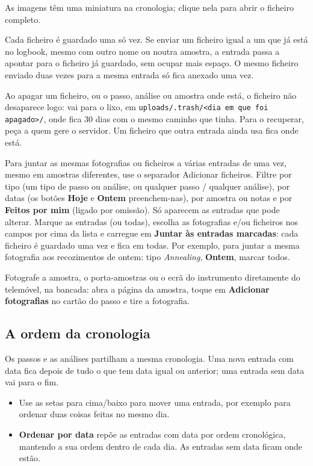 \documentclass[11pt,a4paper]{article}
\newcommand{\ui}[1]{\textsf{\textbf{#1}}}
\newcommand{\menu}[1]{\textsf{#1}}
\begin{document}
As imagens têm uma miniatura na cronologia; clique nela para abrir o
ficheiro completo.

Cada ficheiro é guardado uma só vez. Se enviar um ficheiro igual a um que já
está no logbook, mesmo com outro nome ou noutra amostra, a entrada passa a
apontar para o ficheiro já guardado, sem ocupar mais espaço. O mesmo
ficheiro enviado duas vezes para a mesma entrada só fica anexado uma vez.

Ao apagar um ficheiro, ou o passo, análise ou amostra onde está, o ficheiro
não desaparece logo: vai para o lixo, em
\nolinkurl{uploads/.trash/<dia em que foi apagado>/}, onde fica 30 dias com o
mesmo caminho que tinha. Para o recuperar, peça a quem gere o servidor. Um
ficheiro que outra entrada ainda usa fica onde está.

Para juntar as mesmas fotografias ou ficheiros a várias entradas de uma
vez, mesmo em amostras diferentes, use o separador \menu{Adicionar
ficheiros}. Filtre por tipo (um tipo de passo ou análise, ou qualquer passo
/ qualquer análise), por datas (os botões \ui{Hoje} e \ui{Ontem} preenchem-nas),
por amostra ou notas e por \ui{Feitos por mim} (ligado por omissão). Só
aparecem as entradas que pode alterar. Marque as entradas (ou todas), escolha
as fotografias e/ou ficheiros nos campos por cima da lista e carregue em \ui{Juntar às entradas marcadas}:
cada ficheiro é guardado uma vez e fica em todas. Por exemplo, para juntar a
mesma fotografia aos recozimentos de ontem: tipo \emph{Annealing},
\ui{Ontem}, marcar todos.

\begin{tip}
Fotografe a amostra, o porta-amostras ou o ecrã do instrumento diretamente
do telemóvel, na bancada: abra a página da amostra, toque em
\ui{Adicionar fotografias} no cartão do passo e tire a fotografia.
\end{tip}

\subsection{A ordem da cronologia}
\label{sec:timeline}

Os passos e as análises partilham a mesma cronologia. Uma nova entrada com
data fica depois de tudo o que tem data igual ou anterior; uma entrada sem
data vai para o fim.

\begin{itemize}
  \item Use as setas para cima/baixo para mover uma entrada, por exemplo
        para ordenar duas coisas feitas no mesmo dia.
  \item \ui{Ordenar por data} repõe as entradas com data por ordem
        cronológica, mantendo a sua ordem dentro de cada dia. As entradas
        sem data ficam onde estão.
\end{itemize}
\end{document}
